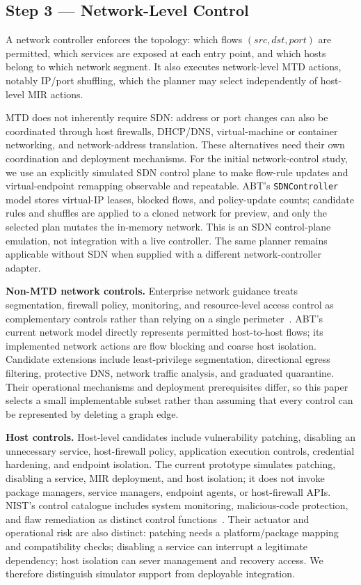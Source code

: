 \documentclass[conference]{IEEEtran}
\begin{document}
\subsection{Step 3 --- Network-Level Control}
\label{sec:netctl}

A network controller enforces the topology: which flows $(\mathit{src},
\mathit{dst},\mathit{port})$ are permitted, which services are exposed at each
entry point, and which hosts belong to which network segment. It also executes
network-level MTD actions, notably IP/port shuffling, which the planner may select
independently of host-level MIR actions.

MTD does not inherently require SDN: address or port changes can also be coordinated
through host firewalls, DHCP/DNS, virtual-machine or container networking, and
network-address translation. These alternatives need their own coordination and
deployment mechanisms. For the initial network-control study, we use an explicitly
simulated SDN control plane to make flow-rule updates and virtual-endpoint remapping
observable and repeatable. ABT's \texttt{SDNController} model stores virtual-IP leases,
blocked flows, and policy-update counts; candidate rules and shuffles are applied to
a cloned network for preview, and only the selected plan mutates the in-memory
network. This is an SDN control-plane emulation, not integration with a live
controller. The same planner remains applicable without SDN when supplied with a
different network-controller adapter.

\textbf{Non-MTD network controls.} Enterprise network guidance treats segmentation,
firewall policy, monitoring, and resource-level access control as complementary
controls rather than relying on a single perimeter~\cite{nist800215,nist80041r1}.
ABT's current network model directly represents permitted host-to-host flows; its
implemented network actions are flow blocking and coarse host isolation. Candidate
extensions include least-privilege segmentation, directional egress filtering,
protective DNS, network traffic analysis, and graduated quarantine. Their
operational mechanisms and deployment prerequisites differ, so this paper selects a
small implementable subset rather than assuming that every control can be represented
by deleting a graph edge.

\textbf{Host controls.} Host-level candidates include vulnerability patching,
disabling an unnecessary service, host-firewall policy, application execution
controls, credential hardening, and endpoint isolation. The current prototype
simulates patching, disabling a service, MIR deployment, and host isolation; it does
not invoke package managers, service managers, endpoint agents, or host-firewall
APIs. NIST's control catalogue includes system monitoring, malicious-code
protection, and flaw remediation as distinct control functions~\cite{nist80053}.
Their actuator and operational risk are also distinct: patching needs a
platform/package mapping and compatibility checks; disabling a service can interrupt
a legitimate dependency; host isolation can sever management and recovery access.
We therefore distinguish simulator support from deployable integration.
\end{document}
